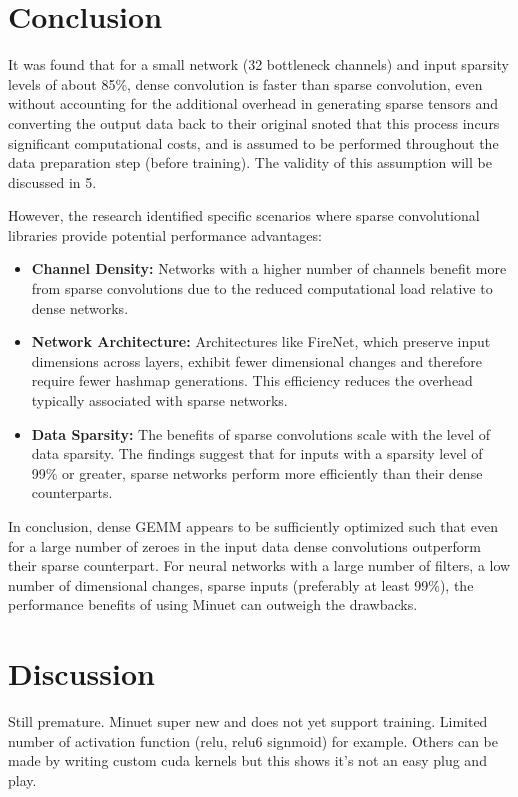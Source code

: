 \documentclass{article}
\begin{document}
\section{Conclusion}
\label{Conclusion}
It was found that for a small network (32 bottleneck channels) and input sparsity levels of about 85\%, dense convolution is faster than sparse convolution, even without accounting for the additional overhead in generating sparse tensors and converting the output data back to their original snoted that this process incurs significant computational costs,
and is assumed to be performed throughout the data preparation step (before training). The validity of this assumption
will be discussed in 5.

However, the research identified specific scenarios where sparse convolutional libraries provide potential performance advantages:
\begin{itemize}
    \item \textbf{Channel Density:} Networks with a higher number of channels benefit more from sparse convolutions due to the reduced computational load relative to dense networks.
    \item \textbf{Network Architecture:} Architectures like FireNet, which preserve input dimensions across layers, exhibit fewer dimensional changes and therefore require fewer hashmap generations. This efficiency reduces the overhead typically associated with sparse networks.
    \item \textbf{Data Sparsity:} The benefits of sparse convolutions scale with the level of data sparsity. The findings suggest that for inputs with a sparsity level of 99\% or greater, sparse networks perform more efficiently than their dense counterparts.
\end{itemize}

In conclusion, dense GEMM appears to be sufficiently optimized such that even for a large number of zeroes in the input data dense convolutions outperform their sparse counterpart. For neural networks with a large number of filters, a low number of dimensional changes, sparse inputs (preferably at least 99\%), the performance benefits of using Minuet can outweigh the drawbacks. 

\section{Discussion}
\label{discussion}

Still premature. Minuet super new and does not yet support training. Limited number of activation function (relu, relu6 signmoid) for example. Others can be made by writing custom cuda kernels but this shows it's not an easy plug and play. 
\end{document}
